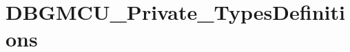 \hypertarget{group___d_b_g_m_c_u___private___types_definitions}{}\section{D\+B\+G\+M\+C\+U\+\_\+\+Private\+\_\+\+Types\+Definitions}
\label{group___d_b_g_m_c_u___private___types_definitions}
